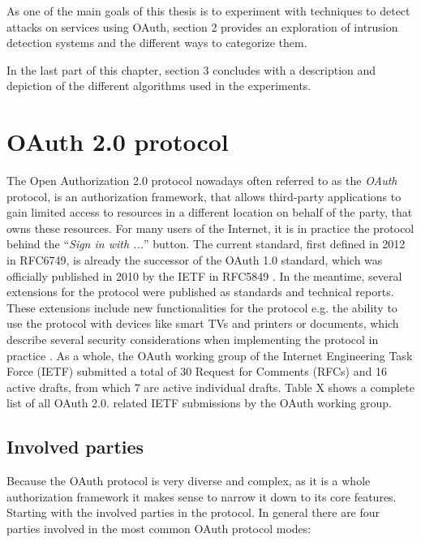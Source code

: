 \documentclass[
    fontsize=12pt,
    headings=small,
    parskip=half,           %
    bibliography=totoc,
    numbers=noenddot,       %
    open=any,               %
    ]{scrreprt}
\begin{document}
As one of the main goals of this thesis is to experiment with techniques to detect attacks on services using OAuth, section 2 provides an exploration of intrusion detection systems and the different ways to categorize them.

In the last part of this chapter, section 3 concludes with a description and depiction of the different algorithms used in the experiments.

\section{OAuth 2.0 protocol}
The Open Authorization 2.0 protocol nowadays often referred to as the
\emph{OAuth} protocol, is an authorization framework, that allows third-party
applications to gain limited access to resources in a different location on
behalf of the party, that owns these resources. For many users of the Internet,
it is in practice the protocol behind the ``\emph{Sign in with ...}'' button.
The current standard, first defined in 2012 in RFC6749, is already the
successor of the OAuth 1.0 standard, which was officially published in 2010 by
the IETF in RFC5849 \cite{hammer2010rfc}. In the meantime, several extensions
for the protocol were published as standards and technical reports. These
extensions include new functionalities for the protocol e.g. the ability to use
the protocol with devices like smart TVs and printers \cite{denniss2019oauth}
or documents, which describe several security considerations when implementing
the protocol in practice \cite{lodderstedt2020oauth}. As a whole, the OAuth
working group of the Internet Engineering Task Force (IETF) submitted a total
of 30 Request for Comments (RFCs) and 16 active drafts, from which 7 are active
individual drafts. Table X shows a complete list of all OAuth 2.0. related IETF
submissions by the OAuth working group. 

\subsection{Involved parties}
Because the OAuth protocol is very diverse and complex, as it is a
whole authorization framework it makes sense to narrow it down to its core
features. Starting with the involved parties in the protocol. In general there
are four parties involved in the most common OAuth protocol modes:
\end{document}
